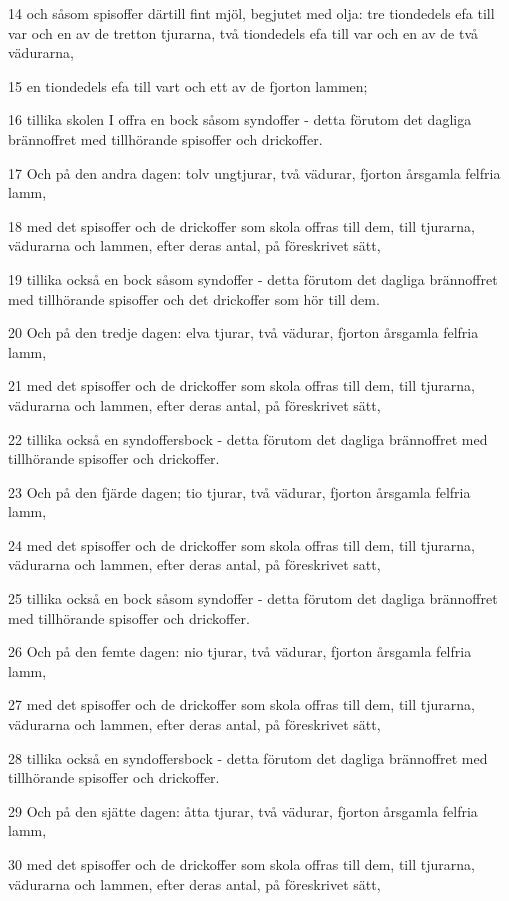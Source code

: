 \par 14 och såsom spisoffer därtill fint mjöl, begjutet med olja: tre tiondedels efa till var och en av de tretton tjurarna, två tiondedels efa till var och en av de två vädurarna,
\par 15 en tiondedels efa till vart och ett av de fjorton lammen;
\par 16 tillika skolen I offra en bock såsom syndoffer - detta förutom det dagliga brännoffret med tillhörande spisoffer och drickoffer.
\par 17 Och på den andra dagen: tolv ungtjurar, två vädurar, fjorton årsgamla felfria lamm,
\par 18 med det spisoffer och de drickoffer som skola offras till dem, till tjurarna, vädurarna och lammen, efter deras antal, på föreskrivet sätt,
\par 19 tillika också en bock såsom syndoffer - detta förutom det dagliga brännoffret med tillhörande spisoffer och det drickoffer som hör till dem.
\par 20 Och på den tredje dagen: elva tjurar, två vädurar, fjorton årsgamla felfria lamm,
\par 21 med det spisoffer och de drickoffer som skola offras till dem, till tjurarna, vädurarna och lammen, efter deras antal, på föreskrivet sätt,
\par 22 tillika också en syndoffersbock - detta förutom det dagliga brännoffret med tillhörande spisoffer och drickoffer.
\par 23 Och på den fjärde dagen; tio tjurar, två vädurar, fjorton årsgamla felfria lamm,
\par 24 med det spisoffer och de drickoffer som skola offras till dem, till tjurarna, vädurarna och lammen, efter deras antal, på föreskrivet satt,
\par 25 tillika också en bock såsom syndoffer - detta förutom det dagliga brännoffret med tillhörande spisoffer och drickoffer.
\par 26 Och på den femte dagen: nio tjurar, två vädurar, fjorton årsgamla felfria lamm,
\par 27 med det spisoffer och de drickoffer som skola offras till dem, till tjurarna, vädurarna och lammen, efter deras antal, på föreskrivet sätt,
\par 28 tillika också en syndoffersbock - detta förutom det dagliga brännoffret med tillhörande spisoffer och drickoffer.
\par 29 Och på den sjätte dagen: åtta tjurar, två vädurar, fjorton årsgamla felfria lamm,
\par 30 med det spisoffer och de drickoffer som skola offras till dem, till tjurarna, vädurarna och lammen, efter deras antal, på föreskrivet sätt,
